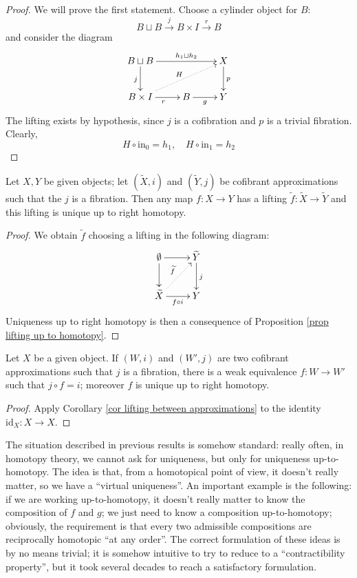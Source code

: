 \begin{refsection}
\begin{proof}
We will prove the first statement. Choose a cylinder object for $B$:
\[
B \sqcup B \xrightarrow{j} B \times I \xrightarrow{r} B
\]
and consider the diagram
\[
\xymatrix{
B \sqcup B \ar[d]_j \ar[rr]^-{h_1 \sqcup h_2} & & X \ar[d]^p \\ B \times I \ar@{.>}[urr]^H \ar[r]_r & B \ar[r]_g & Y
}
\]
The lifting exists by hypothesis, since $j$ is a cofibration and $p$ is a trivial fibration. Clearly,
\[
H \circ \mathrm{in}_0 = h_1, \quad H \circ \mathrm{in}_1 = h_2
\]
\end{proof}

\begin{cor} \label{cor lifting between approximations}
Let $X,Y$ be given objects; let $(\widetilde{X},i)$ and $(\widetilde{Y},j)$ be cofibrant approximations such that the $j$ is a fibration. Then any map $f \colon X \to Y$ has a lifting $\widetilde{f} \colon \widetilde{X} \to \widetilde{Y}$ and this lifting is unique up to right homotopy.
\end{cor}

\begin{proof}
We obtain $\widetilde{f}$ choosing a lifting in the following diagram:
\[
\xymatrix{
\emptyset \ar[d] \ar[r] & \widetilde{Y} \ar[d]^j \\ \widetilde{X} \ar@{.>}[ur]^{\widetilde{f}} \ar[r]_{f \circ i} & Y
}
\]
Uniqueness up to right homotopy is then a consequence of Proposition \ref{prop lifting up to homotopy}.
\end{proof}

\begin{cor} \label{cor uniqueness of approximation}
Let $X$ be a given object. If $(W,i)$ and $(W',j)$ are two cofibrant approximations such that $j$ is a fibration, there is a weak equivalence $f \colon W \to W'$ such that $j \circ f = i$; moreover $f$ is unique up to right homotopy.
\end{cor}

\begin{proof}
Apply Corollary \ref{cor lifting between approximations} to the identity $\mathrm{id}_X \colon X \to X$.
\end{proof}

\begin{rmk}
The situation described in previous results is somehow standard: really often, in homotopy theory, we cannot ask for uniqueness, but only for uniqueness up-to-homotopy. The idea is that, from a homotopical point of view, it doesn't really matter, so we have a ``virtual uniqueness''. An important example is the following: if we are working up-to-homotopy, it doesn't really matter to know the composition of $f$ and $g$; we just need to know a composition up-to-homotopy; obviously, the requirement is that every two admissible compositions are reciprocally homotopic ``at any order''. The correct formulation of these ideas is by no means trivial; it is somehow intuitive to try to reduce to a ``contractibility property'', but it took several decades to reach a satisfactory formulation.


\end{rmk}
\end{refsection}
